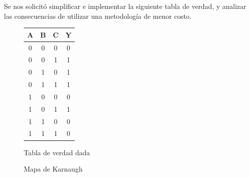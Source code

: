 

Se nos solicitó simplificar e implementar la siguiente tabla de verdad, y analizar las consecuencias de utilizar una metodología de menor costo.


\begin{figure}[H]
\begin{center}
  \begin{minipage}[b]{0.4\textwidth}
  	\begin{center}
  		\begin{tabular}{ccc|c}
A & B & C & Y \\ 
\hline
0 & 0 & 0 & 0 \\  
0 & 0 & 1 & 1 \\  
0 & 1 & 0 & 1 \\  
0 & 1 & 1 & 1 \\  
1 & 0 & 0 & 0 \\  
1 & 0 & 1 & 1 \\  
1 & 1 & 0 & 0 \\  
1 & 1 & 1 & 0 \\  
\end{tabular} 
  	\end{center}
  \caption{Tabla de verdad dada} 
  \label{3_fig1}
  \end{minipage}
  \begin{minipage}[b]{0.4\textwidth}
    \begin{center}
  		\begin{Karnaughvuit}
   \indeterminats{}
\end{Karnaughvuit}
	\end{center}
  \caption{Mapa de Karnaugh} 
  \label{3_fig2}
 \end{minipage}
\end{center}
\end{figure}


